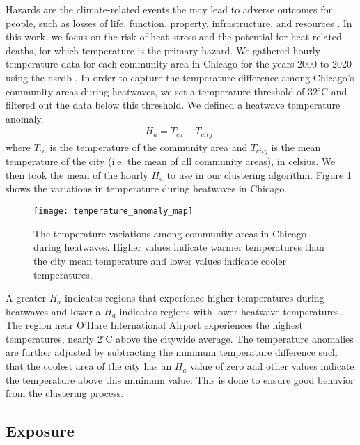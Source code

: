 Hazards are the climate-related events the may lead to adverse outcomes for people,
such as losses of life, function, property, infrastructure, and resources
\cite{viner_understanding_2020}. In this work, we focus on the risk of heat stress
and the potential for heat-related deaths, for which temperature is the primary
hazard. We gathered hourly temperature data for each community area in Chicago for the
years 2000 to 2020 using the \ac{nsrdb} \cite{sengupta_national_2018}. In order
to capture the temperature difference among Chicago's community areas during heatwaves,
we set a temperature threshold of 32$^\circ$C and filtered out the data below this
threshold. We defined a heatwave temperature anomaly,
\begin{eqnarray}
  H_a = T_{ca} - T_{city},
\end{eqnarray}
where $T_{ca}$ is the temperature of the community area and $T_{city}$ is the
mean temperature of the city (i.e. the mean of all community areas), in celsius.
We then took the mean of the hourly $H_a$ to use in our clustering algorithm.
Figure \ref{fig:ha_map} shows the variations in temperature during heatwaves in
Chicago.

\begin{figure}[H]
  \label{fig:ha_map}
    \begin{center}
      \texttt{[image: temperature\_anomaly\_map]}
      \vspace*{-2cm}
      \caption{The temperature variations among community areas in Chicago during
      heatwaves. Higher values indicate warmer temperatures than the city mean
      temperature and lower values indicate cooler temperatures.}
    \end{center}
\end{figure}

A greater $H_a$ indicates regions that experience higher temperatures during
heatwaves and lower a $H_a$ indicates regions with lower heatwave temperatures.
The region near O'Hare International Airport experiences the highest temperatures,
nearly 2$^\circ$C above the citywide average. The temperature anomalies are further
adjusted by subtracting the minimum temperature difference such that the
coolest area of the city has an $\bar{H_a}$ value of zero and other values indicate
the temperature above this minimum value. This is done to ensure good behavior
from the clustering process.

\subsection{Exposure}


